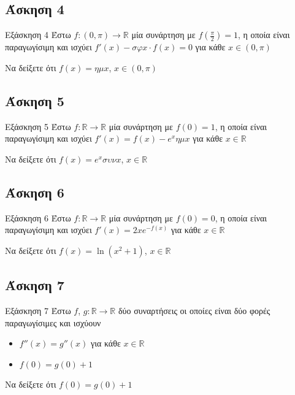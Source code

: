 \documentclass[greek]{beamer}
\begin{document}
\subsection{Άσκηση 4}
\begin{frame}[label=Άσκηση4]{Εξάσκηση 4}
  Έστω $f:(0,π)\to\mathbb{R}$ μία συνάρτηση με $f(\frac{π}{2})=1$, η οποία είναι παραγωγίσιμη και ισχύει $f'(x)-σφx\cdot f(x)=0$ για κάθε $x\in (0,π)$

  Να δείξετε ότι $f(x)=ημx$, $x\in (0,π)$

\end{frame}

\subsection{Άσκηση 5}
\begin{frame}[label=Άσκηση5]{Εξάσκηση 5}
  Έστω $f:\mathbb{R}\to\mathbb{R}$ μία συνάρτηση με $f(0)=1$, η οποία είναι παραγωγίσιμη και ισχύει $f'(x)=f(x)-e^xημx$ για κάθε $x\in\mathbb{R}$

  Να δείξετε ότι $f(x)=e^xσυνx$, $x\in\mathbb{R}$

\end{frame}

\subsection{Άσκηση 6}
\begin{frame}[label=Άσκηση6]{Εξάσκηση 6}
  Έστω $f:\mathbb{R}\to\mathbb{R}$ μία συνάρτηση με $f(0)=0$, η οποία είναι παραγωγίσιμη και ισχύει $f'(x)=2xe^{-f(x)}$ για κάθε $x\in\mathbb{R}$

  Να δείξετε ότι $f(x)=\ln (x^2+1)$, $x\in\mathbb{R}$

\end{frame}

\subsection{Άσκηση 7}
\begin{frame}[label=Άσκηση7]{Εξάσκηση 7}
  Έστω $f$, $g:\mathbb{R}\to\mathbb{R}$ δύο συναρτήσεις οι οποίες είναι δύο φορές παραγωγίσιμες και ισχύουν
  \begin{itemize}
    \item $f''(x)=g''(x)$ για κάθε $x\in\mathbb{R}$
    \item $f(0)=g(0)+1$
  \end{itemize}

  Να δείξετε ότι $f(0)=g(0)+1$

\end{frame}
\end{document}
